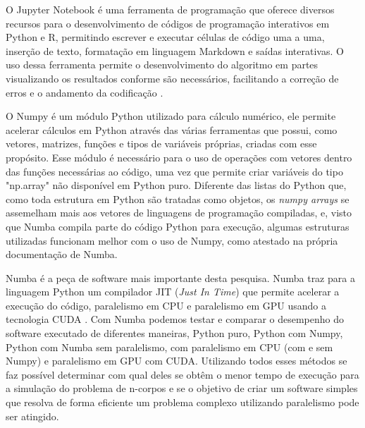 \documentclass[
	12pt,				%
	a4paper,			%
	english,			%
	openright,				%
	brazil,				%
	oneside]{abntex2}
\begin{document}
	O Jupyter Notebook é uma ferramenta de programação que oferece diversos recursos para o desenvolvimento de códigos de programação interativos em Python e R, permitindo escrever e executar células de código uma a uma, inserção de texto, formatação em linguagem Markdown e saídas interativas. O uso dessa ferramenta permite o desenvolvimento do algoritmo em partes visualizando os resultados conforme são necessários, facilitando a correção de erros e o andamento da codificação \cite{perkel2018jupyter}.
	
	O Numpy é um módulo Python utilizado para cálculo numérico, ele permite acelerar cálculos em Python através das várias ferramentas que possui, como vetores, matrizes, funções e tipos de variáveis próprias, criadas com esse propósito. Esse módulo é necessário para o uso de operações com vetores dentro das funções necessárias ao código, uma vez que permite criar variáveis do tipo "np.array" não disponível em Python puro. Diferente das listas do Python que, como toda estrutura em Python são tratadas como objetos, os \textit{numpy arrays} se assemelham mais aos vetores de linguagens de programação compiladas, e, visto que Numba compila parte do código Python para execução, algumas estruturas utilizadas funcionam melhor com o uso de Numpy, como atestado na própria documentação de Numba.
	
	Numba é a peça de software mais importante desta pesquisa. Numba traz para a linguagem Python um compilador JIT (\textit{Just In Time}) que permite acelerar a execução do código, paralelismo em CPU e paralelismo em GPU usando a tecnologia CUDA \cite{numba}. Com Numba podemos testar e comparar o desempenho do software executado de diferentes maneiras, Python puro, Python com Numpy, Python com Numba sem paralelismo, com paralelismo em CPU (com e sem Numpy) e paralelismo em GPU com CUDA. Utilizando todos esses métodos se faz possível determinar com qual deles se obtêm o menor tempo de execução para a simulação do problema de n-corpos e se o objetivo de criar um software simples que resolva de forma eficiente um problema complexo utilizando paralelismo pode ser atingido.
	
\end{document}
